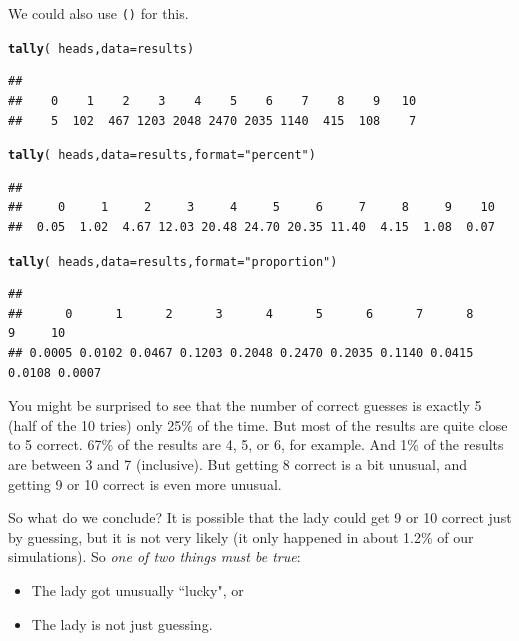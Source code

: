 \documentclass[twoside]{book}\usepackage[]{graphicx}\usepackage[]{xcolor}
\makeatletter
\newcommand{\hlstr}[1]{\textcolor[rgb]{0.192,0.494,0.8}{#1}}%
\newcommand{\hlopt}[1]{\textcolor[rgb]{0,0,0}{#1}}%
\newcommand{\hlstd}[1]{\textcolor[rgb]{0.345,0.345,0.345}{#1}}%
\newcommand{\hlkwc}[1]{\textcolor[rgb]{0.333,0.667,0.333}{#1}}%
\newcommand{\hlkwd}[1]{\textcolor[rgb]{0.737,0.353,0.396}{\textbf{#1}}}%
\newenvironment{kframe}{%
 \def\at@end@of@kframe{}%
 \ifinner\ifhmode%
  \def\at@end@of@kframe{\end{minipage}}%
  \begin{minipage}{\columnwidth}%
 \fi\fi%
 \def\FrameCommand##1{\hskip\@totalleftmargin \hskip-\fboxsep
 \colorbox{shadecolor}{##1}\hskip-\fboxsep
     \hskip-\linewidth \hskip-\@totalleftmargin \hskip\columnwidth}%
 \MakeFramed {\advance\hsize-\width
   \@totalleftmargin\z@ \linewidth\hsize
   \@setminipage}}%
 {\par\unskip\endMakeFramed%
 \at@end@of@kframe}
\newenvironment{knitrout}{}{} %
\newcommand{\Rindex}[1]{\index{\texttt{#1}}}
\newcommand{\function}[1]{{\color{purple!75!blue}\texttt{\StrSubstitute{#1}{()}{}()}}\Rindex{#1}}
\newcounter{example}[section]
\makeatother
\begin{document}
We could also use \function{tally()} for this.
\begin{knitrout}
\color{fgcolor}\begin{kframe}
\begin{alltt}
\hlkwd{tally}\hlstd{(}\hlopt{~}\hlstd{heads,} \hlkwc{data} \hlstd{= results)}
\end{alltt}
\begin{verbatim}
## 
##    0    1    2    3    4    5    6    7    8    9   10 
##    5  102  467 1203 2048 2470 2035 1140  415  108    7
\end{verbatim}
\begin{alltt}
\hlkwd{tally}\hlstd{(}\hlopt{~}\hlstd{heads,} \hlkwc{data} \hlstd{= results,} \hlkwc{format} \hlstd{=} \hlstr{"percent"}\hlstd{)}
\end{alltt}
\begin{verbatim}
## 
##     0     1     2     3     4     5     6     7     8     9    10 
##  0.05  1.02  4.67 12.03 20.48 24.70 20.35 11.40  4.15  1.08  0.07
\end{verbatim}
\begin{alltt}
\hlkwd{tally}\hlstd{(}\hlopt{~}\hlstd{heads,} \hlkwc{data} \hlstd{= results,} \hlkwc{format} \hlstd{=} \hlstr{"proportion"}\hlstd{)}
\end{alltt}
\begin{verbatim}
## 
##      0      1      2      3      4      5      6      7      8      9     10 
## 0.0005 0.0102 0.0467 0.1203 0.2048 0.2470 0.2035 0.1140 0.0415 0.0108 0.0007
\end{verbatim}
\end{kframe}
\end{knitrout}


You might be surprised to see that the number of correct guesses
is exactly 5 (half of the 10 tries) only 
25\%
of the time.  But most of the results are quite close to 5 correct.
67\% of the results are 
4, 5, or 6, for example.
And 1\% of the results 
are  between 3 and 7 (inclusive).
But getting 8 correct is a bit unusual, and getting 9 or 10 correct is even 
more unusual.  

So what do we conclude?  It is possible that the lady could get 9 or 10 correct
just by guessing, but it is not very likely (it only happened in about
1.2\% of our simulations). 
So \emph{one of two things must be true}:
\begin{itemize}
\item The lady got unusually ``lucky", or 
\item The lady is not just guessing.
\end{itemize}
\end{document}
